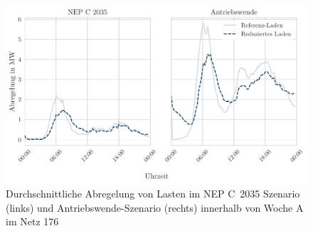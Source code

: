 \begin{figure}[H]
    \centering
    \includegraphics[width=\textwidth]{Bilder/176_load_curtailment_per_strategy}
    \caption{Durchschnittliche Abregelung von Lasten im NEP C~\num{2035} Szenario (links) und Antriebswende-Szenario (rechts) innerhalb von Woche A im Netz \num{176}}\label{fig:176_load_curtailment_per_strategy}
\end{figure}